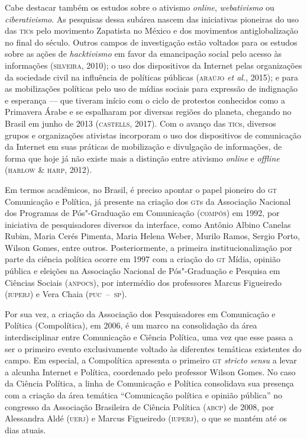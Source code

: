 Cabe destacar também os estudos sobre o ativismo \textit{online},
\textit{webativismo} ou \textit{ciberativismo}. As pesquisas dessa subárea
nascem das iniciativas pioneiras do uso das \textsc{tic}s pelo movimento
Zapatista no México e dos movimentos antiglobalização no final do
século. Outros campos de investigação estão voltados para os estudos
sobre as ações de \textit{hacktivismo} em favor da emancipação social pelo
acesso às informações (\textsc{silveira}, 2010); o uso dos dispositivos da
Internet pelas organizações da sociedade civil na influência de
políticas públicas (\textsc{araújo} \textit{et al.}, 2015); e para as
mobilizações políticas pelo uso de mídias sociais para expressão de
indignação e esperança --- que tiveram início com o ciclo de protestos
conhecidos como a Primavera Árabe e se espalharam por diversas regiões
do planeta, chegando no Brasil em junho de 2013 (\textsc{castells}, 2017). Com o
avanço das \textsc{tic}s, diversos grupos e organizações ativistas incorporam o
uso dos dispositivos de comunicação da Internet em suas práticas de
mobilização e divulgação de informações, de forma que hoje já não existe
mais a distinção entre ativismo \textit{online} e \textit{offline} (\textsc{harlow
\& harp}, 2012).

Em termos acadêmicos, no Brasil, é preciso apontar o papel pioneiro do
\textsc{gt} Comunicação e Política, já presente na criação dos \textsc{gt}s da
Associação Nacional dos Programas de Pós"-Graduação em Comunicação
(\textsc{compós}) em 1992, por iniciativa de pesquisadores diversos da interface,
como Antônio Albino Canelas Rubim, Maria Cerés Pimenta, Maria Helena
Weber, Murilo Ramos, Sergio Porto, Wilson Gomes, entre outros.
Posteriormente, a primeira institucionalização por parte da ciência
política ocorre em 1997 com a criação do \textsc{gt} Mídia, opinião pública e
eleições na Associação Nacional de Pós"-Graduação e Pesquisa em
Ciências Sociais (\textsc{anpocs}), por intermédio dos professores Marcus
Figueiredo (\textsc{iuperj}) e Vera Chaia (\textsc{puc~--~sp}).

Por sua vez, a criação da Associação dos Pesquisadores em Comunicação e
Política (Compolítica), em 2006, é um marco na consolidação da área
interdisciplinar entre Comunicação e Ciência Política, uma vez que esse
passa a ser o primeiro evento exclusivamente voltado às diferentes
temáticas existentes do campo. Em especial, a Compolítica apresenta o
primeiro \textsc{gt} \textit{stricto sensu} a levar a alcunha Internet e
Política, coordenado pelo professor Wilson Gomes. No caso da Ciência
Política, a linha de Comunicação e Política consolidava sua presença com
a criação da área temática ``Comunicação política e opinião pública'' no
congresso da Associação Brasileira de Ciência Política (\textsc{abcp}) de 2008,
por Alessandra Aldé (\textsc{uerj}) e Marcus Figueiredo (\textsc{iuperj}), o que se mantém
até os dias atuais.

